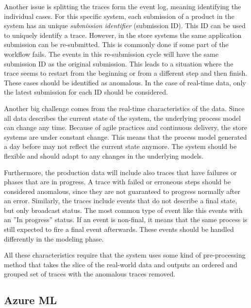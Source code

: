 Another issue is splitting the traces form the event log, meaning identifying the individual cases.
For this specific system, each submission of a product in the system has an unique \emph{submission identifier} (submission ID).
This ID can be used to uniquely identify a trace. 
However, in the store systems the same application submission can be re-submitted.
This is commonly done if some part of the workflow fails.
The events in this re-submission cycle will have the same submission ID as the original submission.
This leads to a situation where the trace seems to restart from the beginning or from a different step and then finish. These cases should be identified as anomalous. In the case of real-time data, only the latest submission for each ID should be considered.

Another big challenge comes from the real-time characteristics of the data. Since all data describes the current state of the system, the underlying process model can change any time. Because of agile practices and continuous delivery, the store systems are under constant change. This means that the process model generated a day before may not reflect the current state anymore. The system should be flexible and should adapt to any changes in the underlying models.

Furthermore, the production data will include also traces that have failures or phases that are in progress.
A trace with failed or erroneous steps should be considered anomalous, since they are not guaranteed to progress normally after an error. 
Similarly, the traces include events that do not describe a final state, but only broadcast status. 
The most common type of event like this events with an ''In progress'' status.
If an event is non-final, it means that the same process is still expected to fire a final event afterwards.
These events should be handled differently in the modeling phase.

All these characteristics require that the system uses some kind of pre-processing method that takes the slice of the real-world data and outputs an ordered and grouped set of traces with the anomalous traces removed.

\subsection{Azure ML}

